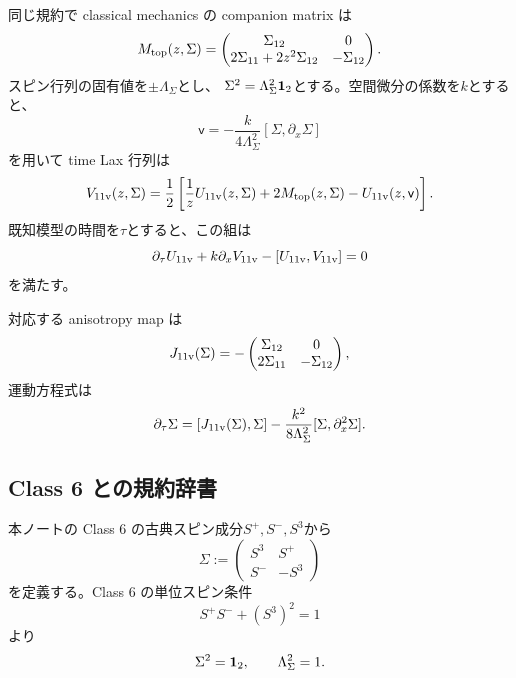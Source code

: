 同じ規約で classical mechanics の companion matrix は
\begin{equation}
M_{\rm top}(z,\Sigma)=
\begin{pmatrix}
\Sigma_{12}&0\\
2\Sigma_{11}+2z^2\Sigma_{12}&-\Sigma_{12}
\end{pmatrix}.
\label{eq:eleven-Mtop}
\end{equation}
スピン行列の固有値を$\pm\Lambda_{\Sigma}$とし、
$\Sigma^2=\Lambda_{\Sigma}^2\mathbf 1_2$とする。空間微分の係数を$k$とすると、
\begin{equation}
\mathsf v
=-\frac{k}{4\Lambda_{\Sigma}^2}[\Sigma,\partial_x\Sigma]
\label{eq:eleven-vaux}
\end{equation}
を用いて time Lax 行列は
\begin{equation}
V_{\rm 11v}(z,\Sigma)
=\frac12\left[
\frac1zU_{\rm 11v}(z,\Sigma)
+2M_{\rm top}(z,\Sigma)
-U_{\rm 11v}(z,\mathsf v)
\right].
\label{eq:eleven-V}
\end{equation}
既知模型の時間を$\tau$とすると、この組は
\begin{equation}
\partial_{\tau}U_{\rm 11v}
+k\partial_xV_{\rm 11v}
-[U_{\rm 11v},V_{\rm 11v}]=0
\label{eq:eleven-zc}
\end{equation}
を満たす\cite{AtalikovZotov2021}。

対応する anisotropy map は
\begin{equation}
J_{\rm 11v}(\Sigma)
=-\begin{pmatrix}
\Sigma_{12}&0\\
2\Sigma_{11}&-\Sigma_{12}
\end{pmatrix},
\label{eq:eleven-J}
\end{equation}
運動方程式は
\begin{equation}
\partial_{\tau}\Sigma
=[J_{\rm 11v}(\Sigma),\Sigma]
-\frac{k^2}{8\Lambda_{\Sigma}^2}
[\Sigma,\partial_x^2\Sigma].
\label{eq:eleven-eom}
\end{equation}

\subsection{Class 6 との規約辞書}

本ノートの Class 6 の古典スピン成分$S^+,S^-,S^3$から
\begin{equation}
\Sigma:=
\begin{pmatrix}
S^3&S^+\\
S^-&-S^3
\end{pmatrix}
\label{eq:class6-eleven-spin}
\end{equation}
を定義する。Class 6 の単位スピン条件
\begin{equation}
S^+S^-+(S^3)^2=1
\label{eq:class6-eleven-constraint}
\end{equation}
より
\begin{equation}
\Sigma^2=\mathbf 1_2,
\qquad \Lambda_{\Sigma}^2=1.
\label{eq:class6-eleven-characteristic}
\end{equation}

